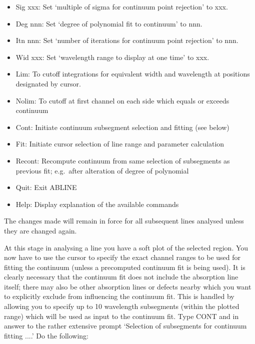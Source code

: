\begin{itemize}
\item Sig xxx: Set `multiple of sigma for continuum point rejection' to
   xxx.
\item Deg nnn: Set `degree of polynomial fit to continuum' to nnn.
\item Itn nnn: Set `number of iterations for continuum point rejection'
   to nnn.
\item Wid xxx: Set `wavelength range to display at one time' to xxx.
\item Lim: To cutoff integrations for equivalent width and wavelength at
   positions designated by cursor.
\item Nolim: To cutoff at first channel on each side which equals or
   exceeds continuum
\item Cont: Initiate continuum subsegment selection and fitting (see
   below)
\item Fit: Initiate cursor selection of line range and parameter
   calculation
\item Recont: Recompute continuum from same selection of subsegments as
   previous fit; e.g.\ after alteration of degree of polynomial
\item Quit: Exit ABLINE
\item Help: Display explanation of the available commands
\end{itemize}

The changes made will remain 
in force for all subsequent lines analysed unless they are changed again.

At this stage in analysing a line you have a soft plot of the selected 
region. You now have to use the cursor to specify the exact channel ranges 
to be used for fitting the continuum (unless a precomputed continuum fit is 
being used). It is clearly necessary that the continuum fit does not 
include the absorption line itself; there may also be other absorption 
lines or defects nearby which you want to explicitly exclude from 
influencing the continuum fit. This is handled by allowing you to specify 
up to 10 wavelength subsegments (within the plotted range) which will be 
used as input to the continuum fit. 
Type CONT and in answer to the rather extensive 
prompt `Selection of subsegments for continuum fitting ....' Do the 
following:

